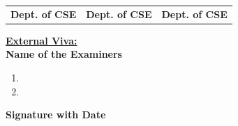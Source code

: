 \begin{titlepage}
\begin{tabular}{l  l  l}
\textbf{Dept. of CSE} & \hspace{0.7cm}\textbf{Dept. of CSE}  & \hspace{0.7cm}\textbf{Dept. of CSE}\\[0.2in]
\end{tabular}
\begin{multicols}{2}
\textup{\underline{\textbf{External Viva:}}} \\ 
\textup{\textbf{Name of the Examiners}} \\
\begin{enumerate}
\item{}
\item{}
\end{enumerate}
\columnbreak
\hspace{2.7cm} \textup{\textbf{Signature with Date}}
\end{multicols}
\end{titlepage}